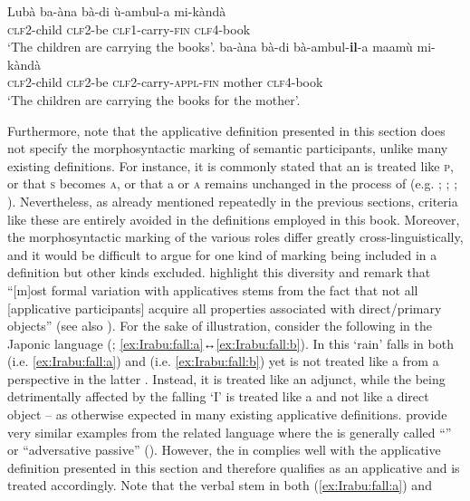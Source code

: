 \ea Lubà \citep[103]{de-kind:bostoen:2012}
\ea\label{ex:Luba:carry:a}
	\gll	ba-àna bà-di ù-ambul-a mi-kàndà \\
			\textsc{clf2}-child \textsc{clf2}-be \textsc{clf1}-carry-\textsc{fin} \textsc{clf4}-book \\
	\glt	‘The children are carrying the books’.
\ex\label{ex:Luba:carry:b}
	\gll	ba-àna bà-di bà-ambul-\textbf{il}-a maamù mi-kàndà \\
			\textsc{clf2}-child \textsc{clf2}-be \textsc{clf2}-carry-\textsc{appl-fin} mother \textsc{clf4}-book \\
	\glt	‘The children are carrying the books for the mother’.
	\z 
\z

Furthermore, note that the applicative definition presented in this section does not specify the morphosyntactic marking of semantic participants, unlike many existing definitions. For instance, it is commonly stated that an  is treated like \textsc{p}, or that \textsc{s} becomes \textsc{a}, or that a  or \textsc{a} remains unchanged in the process of  (e.g. \citealt[31]{dixon:2000}; \citealt[13f.]{dixon:aikhenvald:2000}; \citealt[412f.]{malchukov:2016}; \citealt[53]{zuniga:kittila:2019}). Nevertheless, as already mentioned repeatedly in the previous sections, criteria like these are entirely avoided in the definitions employed in this book. Moreover, the morphosyntactic marking of the various roles differ greatly cross-linguistically, and it would be difficult to argue for one kind of marking being included in a definition but other kinds excluded. \cite[63]{zuniga:kittila:2019} highlight this diversity and remark that “[m]ost formal variation with applicatives stems from the fact that not all [applicative participants] acquire all properties associated with direct/primary objects” (see also \citealt{beck:2009}). For the sake of illustration, consider the following  in the Japonic language  (; \ref{ex:Irabu:fall:a}↔\ref{ex:Irabu:fall:b}). In this  ‘rain’ falls in both  (i.e. \ref{ex:Irabu:fall:a}) and  (i.e. \ref{ex:Irabu:fall:b}) yet is not treated like a  from a  perspective in the latter . Instead, it is treated like an adjunct, while the  being detrimentally affected by the falling ‘I’ is treated like a  and not like a direct object -- as otherwise expected in many existing applicative definitions. \cite[776]{kishimoto:al:2015} provide very similar examples from the related language  where the  is generally called “” or “adversative passive” (\citealt[76ff., 244]{zuniga:kittila:2019}). However, the  in  complies well with the applicative definition presented in this section and therefore qualifies as an applicative  and is treated accordingly. Note that the verbal stem in both (\ref{ex:Irabu:fall:a}) and 
